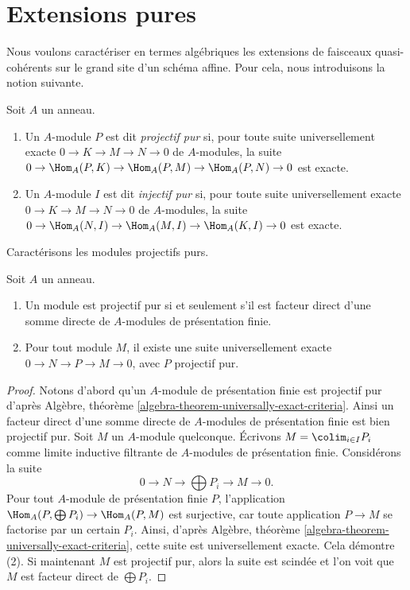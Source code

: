 \section{Extensions pures}
\label{section-pure}

\noindent
Nous voulons caractériser en termes algébriques les extensions de faisceaux
quasi-cohérents sur le grand site d'un schéma affine. Pour cela,
nous introduisons la notion suivante.

\begin{definition}
\label{definition-pure}
Soit $A$ un anneau.
\begin{enumerate}
\item Un $A$-module $P$ est dit {\it projectif pur}
si, pour toute suite universellement exacte
$0 \to K \to M \to N \to 0$ de $A$-modules, la suite
$0 \to \Hom_A(P, K) \to \Hom_A(P, M) \to \Hom_A(P, N) \to 0$
est exacte.
\item Un $A$-module $I$ est dit {\it injectif pur}
si, pour toute suite universellement exacte
$0 \to K \to M \to N \to 0$ de $A$-modules, la suite
$0 \to \Hom_A(N, I) \to \Hom_A(M, I) \to \Hom_A(K, I) \to 0$
est exacte.
\end{enumerate}
\end{definition}

\noindent
Caractérisons les modules projectifs purs.

\begin{lemma}
\label{lemma-pure-projective}
Soit $A$ un anneau.
\begin{enumerate}
\item Un module est projectif pur si et seulement s'il est
facteur direct d'une somme directe de $A$-modules de présentation finie.
\item Pour tout module $M$, il existe une suite universellement exacte
$0 \to N \to P \to M \to 0$, avec $P$ projectif pur.
\end{enumerate}
\end{lemma}

\begin{proof}
Notons d'abord qu'un $A$-module de présentation finie est projectif pur d'après
Algèbre, théorème \ref{algebra-theorem-universally-exact-criteria}.
Ainsi un facteur direct d'une somme directe de $A$-modules de présentation finie
est bien projectif pur. Soit $M$ un $A$-module quelconque.
Écrivons $M = \colim_{i \in I} P_i$ comme limite inductive filtrante de
$A$-modules de présentation finie. Considérons la suite
$$
0 \to N \to \bigoplus P_i \to M \to 0.
$$
Pour tout $A$-module de présentation finie $P$, l'application
$\Hom_A(P, \bigoplus P_i) \to \Hom_A(P, M)$
est surjective, car toute application $P \to M$ se factorise par un certain $P_i$.
Ainsi, d'après
Algèbre, théorème \ref{algebra-theorem-universally-exact-criteria},
cette suite est universellement exacte. Cela démontre (2).
Si maintenant $M$ est projectif pur, alors la suite est scindée et
l'on voit que $M$ est facteur direct de $\bigoplus P_i$.
\end{proof}

